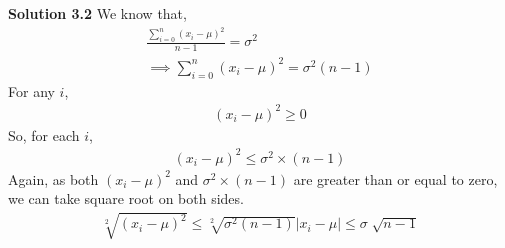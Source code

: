 \begin{tcolorbox}[breakable]
\begin{sol}
		\textbf{Solution 3.2}
		We know that,
		\begin{align*}
			\frac{\sum^n_{i=0}(x_i-\mu)^2}{n-1}=\sigma^2 \\
			\implies \sum^n_{i=0}(x_i-\mu)^2 = \sigma^2(n-1)
		\end{align*}
		For any $i$,
		\begin{align*}
			(x_i-\mu)^2\geq0
		\end{align*}
		So, for each $i$,
		\begin{align*}
			(x_i-\mu)^2\leq\sigma^2\times(n-1)
		\end{align*}
		Again, as both $(x_i-\mu)^2$ and $\sigma^2\times(n-1)$ are greater than or equal to zero, we can take square root on both sides.
		\begin{align*}
			\sqrt[2]{(x_i-\mu)^2}\leq\sqrt[2]{\sigma^2(n-1)}
			|x_i-\mu|\leq\sigma\sqrt[]{n-1}
		\end{align*}

	\end{sol}
\end{tcolorbox}
